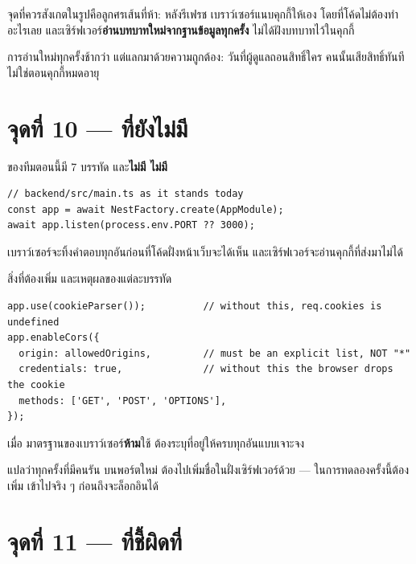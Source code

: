 จุดที่ควรสังเกตในรูปคือลูกศรเส้นที่ห้า: หลังรีเฟรช เบราว์เซอร์แนบคุกกี้ให้เอง
โดยที่โค้ดไม่ต้องทำอะไรเลย และเซิร์ฟเวอร์\textbf{อ่านบทบาทใหม่จากฐานข้อมูลทุกครั้ง}
ไม่ได้ฝังบทบาทไว้ในคุกกี้

การอ่านใหม่ทุกครั้งช้ากว่า แต่แลกมาด้วยความถูกต้อง: วันที่ผู้ดูแลถอนสิทธิ์ใคร
คนนั้นเสียสิทธิ์ทันที ไม่ใช่ตอนคุกกี้หมดอายุ

\section{จุดที่ 10 ---  ที่ยังไม่มี}

 ของทีมตอนนี้มี 7 บรรทัด และ\textbf{ไม่มี 
ไม่มี }

\begin{badbox}[title={\pone\ ถ้าไม่ตั้งสองอย่างนี้ ทุกอย่างที่เหลือใช้ไม่ได้}]
\begin{lstlisting}
// backend/src/main.ts as it stands today
const app = await NestFactory.create(AppModule);
await app.listen(process.env.PORT ?? 3000);
\end{lstlisting}
\vspace{-0.4em}
เบราว์เซอร์จะทิ้งคำตอบทุกอันก่อนที่โค้ดฝั่งหน้าเว็บจะได้เห็น
และเซิร์ฟเวอร์จะอ่านคุกกี้ที่ส่งมาไม่ได้
\end{badbox}

สิ่งที่ต้องเพิ่ม และเหตุผลของแต่ละบรรทัด

\begin{lstlisting}
app.use(cookieParser());          // without this, req.cookies is undefined
app.enableCors({
  origin: allowedOrigins,         // must be an explicit list, NOT "*"
  credentials: true,              // without this the browser drops the cookie
  methods: ['GET', 'POST', 'OPTIONS'],
});
\end{lstlisting}

\begin{warnbox}[title={กับดักที่คนเจอบ่อยที่สุดเรื่อง \en{CORS} กับคุกกี้}]
เมื่อ  มาตรฐานของเบราว์เซอร์\textbf{ห้าม}ใช้
 ต้องระบุที่อยู่ให้ครบทุกอันแบบเจาะจง

แปลว่าทุกครั้งที่มีคนรัน  บนพอร์ตใหม่ ต้องไปเพิ่มชื่อในฝั่งเซิร์ฟเวอร์ด้วย
--- ในการทดลองครั้งนี้ต้องเพิ่ม  เข้าไปจริง ๆ
ก่อนถึงจะล็อกอินได้
\end{warnbox}

\section{จุดที่ 11 ---  ที่ชี้ผิดที่}


